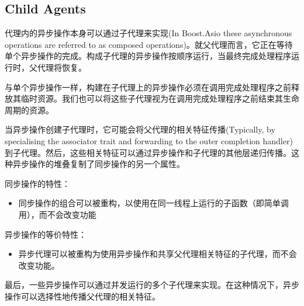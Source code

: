 \subsection{Child Agents}
代理内的异步操作本身可以通过子代理来实现(In Boost.Asio these asynchronous operations are referred to as composed operations)。就父代理而言，它正在等待单个异步操作的完成。构成子代理的异步操作按顺序运行，当最终完成处理程序运行时，父代理将恢复。

与单个异步操作一样，构建在子代理上的异步操作必须在调用完成处理程序之前释放其临时资源。我们也可以将这些子代理视为在调用完成处理程序之前结束其生命周期的资源。

当异步操作创建子代理时，它可能会将父代理的相关特征传播(Typically, by specialising the associator trait and forwarding to the outer completion handler)到子代理。然后，这些相关特征可以通过异步操作和子代理的其他层递归传播。这种异步操作的堆叠复制了同步操作的另一个属性。

同步操作的特性：
\begin{itemize}
	\item 同步操作的组合可以被重构，以使用在同一线程上运行的子函数（即简单调用），而不会改变功能
\end{itemize}


异步操作的等价特性：
\begin{itemize}
	\item 异步代理可以被重构为使用异步操作和共享父代理相关特征的子代理，而不会改变功能。
\end{itemize}

最后，一些异步操作可以通过并发运行的多个子代理来实现。在这种情况下，异步操作可以选择性地传播父代理的相关特征。